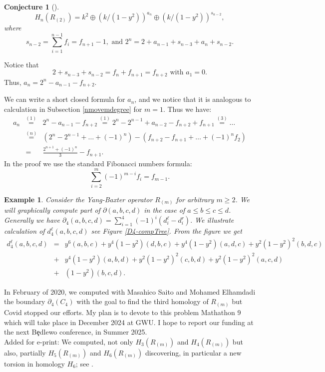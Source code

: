\documentclass[12pt]{amsart}
\newtheorem{example}[theorem]{Example}
\newtheorem{conjecture}[theorem]{Conjecture}
\begin{document}
\begin{conjecture}[\cite{PrWa1}]\label{HnR2}
\begin{equation*}
H_n(R_{(2)})= k^2\oplus (k/(1-y^2))^{a_n}\oplus  (k/(1-y^2))^{s_{n-2}},   
\end{equation*}
where 
\begin{equation*}
s_{n-2}=\sum_{i=1}^{n-1}f_i = f_{n+1}-1,\,\,\text{and}\,\, 2^n=2+a_{n-1}+s_{n-3}+a_n+s_{n-2}. 
\end{equation*}
\end{conjecture}
Notice that 
\begin{equation*}
2 + s_{n-3}+s_{n-2} = f_n+f_{n+1} = f_{n+2}\,\,\text{with}\,\, a_1=0.
\end{equation*}
Thus, $a_n= 2^n - a_{n-1}-f_{n+2}$.

We can write a short closed formula for $a_n$, and we notice that it is analogous to calculation in Subsection \ref{nmovemdegree} for $m=1$. 
Thus we have:
\begin{eqnarray*}
a_n &\stackrel{(1)}{=}& 2^n - a_{n-1}-f_{n+2} \stackrel{(1)}{=}2^n-2^{n-1}+a_{n-2}-f_{n+2}+f_{n+1}  \stackrel{(3)}{=} \ldots \\
&\stackrel{(n)}{=}& (2^n-2^{n-1} + \ldots + (-1)^n) - (f_{n+2}-f_{n+1} + \ldots +(-1)^nf_2) \\
&=& \frac{2^{n+1}+(-1)^n}{3} - f_{n+1}.
\end{eqnarray*}
In the proof we use the standard Fibonacci numbers formula:
\begin{equation*}
\sum_{i=2}^m(-1)^{m-i}f_i= f_{m-1}.    
\end{equation*}
\begin{example}
Consider the Yang-Baxter operator $R_{(m)}$ for arbitrary $m\geq 2$. 
We will graphically compute part of $\partial(a,b,c,d)$ in the case of 
$a\leq b\leq c\leq d$. Generally we have $\partial_4(a,b,c,d)=\sum_{i=1}^4(-1)^i (d_i^{\ell}-d_i^r) .$
We illustrate calculation of $d_4^{\ell}(a,b,c,d)$ see Figure \ref{D4-compTree}. 
From the figure we get 
\begin{eqnarray*}
d_4^{\ell}(a,b,c,d)&=& y^6(a,b,c) +y^4(1-y^2)(d,b,c)+ y^4(1-y^2)(a,d,c) + y^2(1-y^2)^2(b,d,c)\\
&+& y^4(1-y^2)(a,b,d)+ y^2(1-y^2)^2(c,b,d) + y^2(1-y^2)^2(a,c,d)\\
&+&(1-y^2)(b,c,d).
\end{eqnarray*}
\end{example}
In February of 2020, we computed with Masahico Saito and Mohamed Elhamdadi the boundary $\partial_4(C_4)$ with the goal to find the third homology of $R_{(m)}$ but Covid stopped our efforts. My plan is to devote to this problem Mathathon 9 which will take place in December 2024 at GWU. I hope to report our funding at the next B{\c e}dlewo conference, in Summer 2025.\\
{\color{red}Added for e-print: We computed, not only $H_3(R_{(m)})$ and $H_4(R_{(m)})$ but also, partially $H_5(R_{(m)})$ and $H_6(R_{(m)})$ discovering, in particular a new torsion in homology $H_6$; see \cite{CCGOPWY}. }
\end{document}

